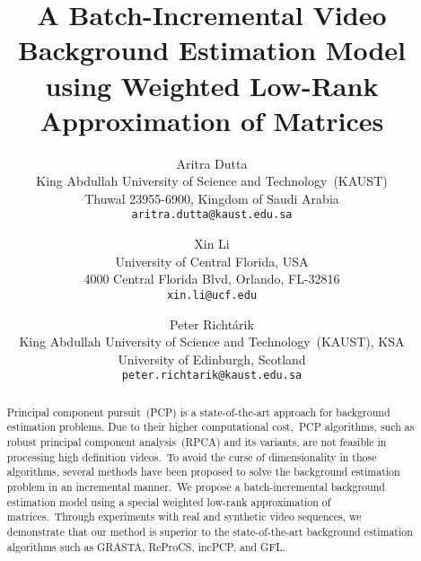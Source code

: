 \documentclass[10pt,twocolumn,letterpaper]{article}
\begin{document}
\title{A Batch-Incremental Video Background Estimation Model\\using Weighted Low-Rank Approximation of Matrices}

\author{Aritra Dutta\\
    King Abdullah University of Science and Technology~(KAUST)\\
    Thuwal 23955-6900, Kingdom of Saudi Arabia\\
    {\tt\small aritra.dutta@kaust.edu.sa}
    \and
    Xin Li\\
    University of Central Florida, USA\\
    4000 Central Florida Blvd, Orlando, FL-32816\\
    {\tt\small xin.li@ucf.edu}
    \and
    Peter Richt\'arik\\
    King Abdullah University of Science and Technology~(KAUST), KSA\\
    University of Edinburgh, Scotland\\
    {\tt\small peter.richtarik@kaust.edu.sa}
}


\maketitle


\begin{abstract}
Principal component pursuit~(PCP) is a state-of-the-art approach for background estimation problems. Due to their higher computational cost,~PCP algorithms, such as robust principal component analysis~(RPCA) and its variants, are not feasible in processing high definition videos.~To avoid the curse of dimensionality in those algorithms, several methods have been proposed to solve the background estimation problem in an incremental manner.~We propose a batch-incremental background estimation model using a special weighted low-rank approximation of matrices.~Through experiments with real and synthetic video sequences, we demonstrate that our method is superior to the state-of-the-art background estimation algorithms such as GRASTA, ReProCS, incPCP, and GFL.
\end{abstract}

\vspace{-0.0in}
\end{document}
